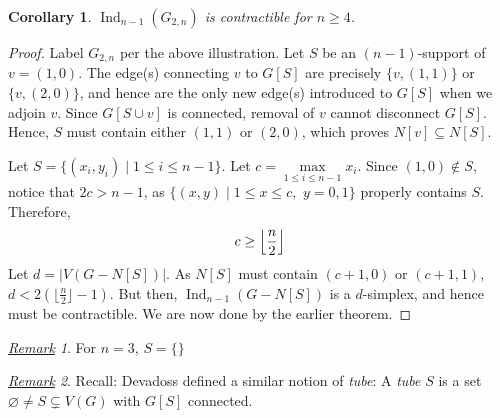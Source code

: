 \documentclass{amsart}
\theoremstyle{theorem}
\theoremstyle{proposition}
\newtheorem{corollary}{Corollary}[theorem]
\theoremstyle{remark}
\newtheorem{remark}{\underline{Remark}}[section]
\theoremstyle{definition}
\theoremstyle{remark}
\theoremstyle{remark}
\begin{document}
\begin{corollary} 
$\operatorname{Ind}_{n-1}(G_{2,n})$ is contractible for $n\geq 4$.
\end{corollary}
\begin{proof} Label $G_{2,n}$ per the above illustration. Let $S$ be an $(n-1)$-support of $v=(1,0)$. The edge(s) connecting $v$ to $G[S]$ are precisely $\{v,(1,1)\}$ or $\{v,(2,0)\}$, and hence are the only new edge(s) introduced to $G[S]$ when we adjoin $v$. Since $G[S\cup v]$ is connected, removal of $v$ cannot disconnect $G[S]$. Hence, $S$ must contain either $(1,1)$ or $(2,0)$, which proves $N[v]\subseteq N[S]$.
\par Let $S=\{(x_i,y_i)\mid1\leq i\leq n-1\}$. Let $c = \max\limits_{1\leq i\leq n-1}x_i$. Since $(1,0)\not\in S$, notice that $2c>n-1$, as $\{(x,y)\mid 1\leq x\leq c,\,\,y=0,1\}$ properly contains $S$. Therefore,
\begin{equation}
c\geq \Bigl\lfloor\frac{n}{2}\Bigl\rfloor
\end{equation}
Let $d = |V(G-N[S])|$. As $N[S]$ must contain $(c+1,0)$ or $(c+1,1)$, $d<2(\lfloor\frac{n}{2}\rfloor-1)$. But then, $\operatorname{Ind}_{n-1}(G-N[S])$ is a $d$-simplex, and hence must be contractible. We are now done by the earlier theorem.
\end{proof}
\begin{remark}
For $n=3$, $S = \{\}$
\end{remark}
\begin{remark}
Recall: Devadoss \cite{dev} defined a similar notion of \emph{tube}: A \emph{tube} $S$ is a set $\varnothing\neq S\subsetneq V(G)$ with $G[S]$ connected. 
\end{remark}
\end{document}
